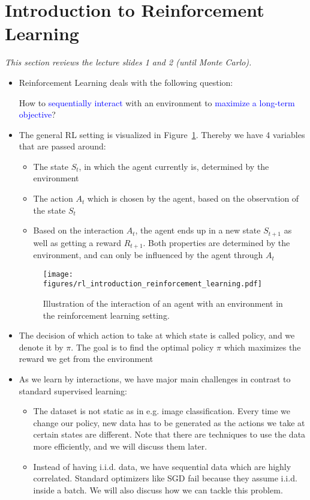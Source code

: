 \section{Introduction to Reinforcement Learning}
\textit{This section reviews the lecture slides 1 and 2 (until Monte Carlo). }
\begin{itemize}
	\item Reinforcement Learning deals with the following question: 
	
	How to \textcolor{blue}{sequentially interact} with an environment to \textcolor{blue}{maximize a long-term objective}?
	
	\item The general RL setting is visualized in Figure~\ref{fig:rl_introduction_reinforcement_learning}. Thereby we have 4 variables that are passed around:
	\begin{itemize}
		\item The state $S_t$, in which the agent currently is, determined by the environment
		\item The action $A_t$ which is chosen by the agent, based on the observation of the state $S_t$
		\item Based on the interaction $A_t$, the agent ends up in a new state $S_{t+1}$ as well as getting a reward $R_{t+1}$. Both properties are determined by the environment, and can only be influenced by the agent through $A_t$
	\end{itemize}
	\begin{figure}[ht!]
		\centering
		\texttt{[image: figures/rl\_introduction\_reinforcement\_learning.pdf]}
		\caption{Illustration of the interaction of an agent with an environment in the reinforcement learning setting.}
		\label{fig:rl_introduction_reinforcement_learning}
	\end{figure}

	\item The decision of which action to take at which state is called policy, and we denote it by $\pi$. The goal is to find the optimal policy $\pi$ which maximizes the reward we get from the environment
		
	\item As we learn by interactions, we have major main challenges in contrast to standard supervised learning:
	\begin{itemize}
		\item The dataset is not static as in e.g. image classification. Every time we change our policy, new data has to be generated as the actions we take at certain states are different. Note that there are techniques to use the data more efficiently, and we will discuss them later.  
		\item Instead of having i.i.d. data, we have sequential data which are highly correlated. Standard optimizers like SGD fail because they assume i.i.d. inside a batch. We will also discuss how we can tackle this problem.
	\end{itemize}
\end{itemize}
